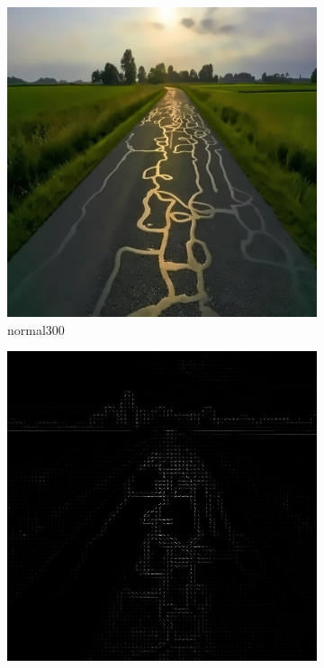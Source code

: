 \documentclass[a4paper, 10pt]{article}
\begin{document}
\begin{figure}[htbp]
		\begin{subfigure}{0.24\textwidth}
			\includegraphics[width=\linewidth]{picture/alldata/normal300}
			\caption{normal300}
			\label{fig: normal300}	
		\end{subfigure}
		\begin{subfigure}{0.24\textwidth}
			\includegraphics[width=\linewidth]{picture/alldata_hog/normal300}

\end{subfigure}
\end{figure}
\end{document}
